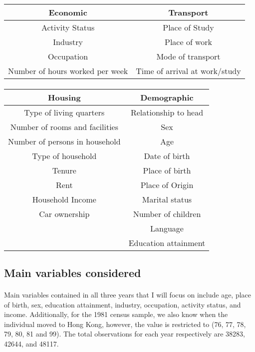 \documentclass[12pt]{article}
\begin{document}
\begin{table}[h]
\begin{center}
\begin{tabular}{cc}
\hline
\hline
Economic & Transport\\
\hline
Activity Status & Place of Study\\
Industry &  Place of work\\
Occupation &Mode of transport\\
Number of hours worked per week & Time of arrival at work/study\\
\hline
\end{tabular}
\end{center}
\end{table}

\paragraph{}
\begin{table}[h]
\begin{center}
\begin{tabular}{cc}
\hline
\hline
Housing & Demographic\\
\hline
Type of living quarters & Relationship to head\\
Number of rooms and facilities &  Sex\\
Number of persons in household &Age\\
Type of household &Date of birth\\
Tenure &Place of birth\\
Rent & Place of Origin\\
Household Income & Marital status\\
Car ownership & Number of children\\
& Language\\
&Education attainment\\
\hline
\end{tabular}
\end{center}
\end{table}


\bigskip

\subsection{Main variables considered}


\paragraph{}
Main variables contained in all three years that I will focus on include age, place of birth, sex, education attainment, industry, occupation, activity status, and income. Additionally, for the 1981 census sample, we also know when the individual moved to Hong Kong, however, the value is restricted to (76, 77, 78, 79, 80, 81 and 99). The total observations for each year respectively are 38283, 42644, and 48117.
\end{document}
